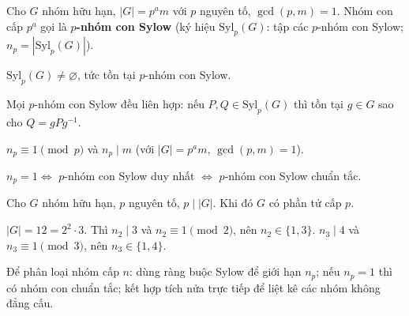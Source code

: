 \documentclass[12pt,a4paper]{article}
\begin{document}
\begin{dinhnghia}
  Cho $G$ nhóm hữu hạn, $|G| = p^a m$ với $p$ nguyên tố, $\gcd(p, m) = 1$. Nhóm con cấp $p^a$ gọi là \textbf{$p$-nhóm con Sylow} (ký hiệu $\mathrm{Syl}_p(G)$: tập các $p$-nhóm con Sylow; $n_p = |\mathrm{Syl}_p(G)|$).
\end{dinhnghia}

\begin{dinhly}[title={Định lý Sylow thứ nhất}]
  $\mathrm{Syl}_p(G) \ne \varnothing$, tức tồn tại $p$-nhóm con Sylow.
\end{dinhly}

\begin{dinhly}[title={Định lý Sylow thứ hai}]
  Mọi $p$-nhóm con Sylow đều liên hợp: nếu $P, Q \in \mathrm{Syl}_p(G)$ thì tồn tại $g \in G$ sao cho $Q = gPg^{-1}$.
\end{dinhly}

\begin{dinhly}[title={Định lý Sylow thứ ba}]
  $n_p \equiv 1 \pmod{p}$ và $n_p \mid m$ (với $|G| = p^a m$, $\gcd(p, m) = 1$).
\end{dinhly}

\begin{tinhchat}
  $n_p = 1 \Leftrightarrow$ $p$-nhóm con Sylow duy nhất $\Leftrightarrow$ $p$-nhóm con Sylow chuẩn tắc.
\end{tinhchat}

\begin{dinhly}[title={Định lý Cauchy}]
  Cho $G$ nhóm hữu hạn, $p$ nguyên tố, $p \mid |G|$. Khi đó $G$ có phần tử cấp $p$.
\end{dinhly}

\begin{vidu}
  $|G| = 12 = 2^2 \cdot 3$. Thì $n_2 \mid 3$ và $n_2 \equiv 1 \pmod{2}$, nên $n_2 \in \{1, 3\}$. $n_3 \mid 4$ và $n_3 \equiv 1 \pmod{3}$, nên $n_3 \in \{1, 4\}$.
\end{vidu}

\begin{phuongphap}
  Để phân loại nhóm cấp $n$: dùng ràng buộc Sylow để giới hạn $n_p$; nếu $n_p = 1$ thì có nhóm con chuẩn tắc; kết hợp tích nửa trực tiếp để liệt kê các nhóm không đẳng cấu.
\end{phuongphap}
\end{document}
